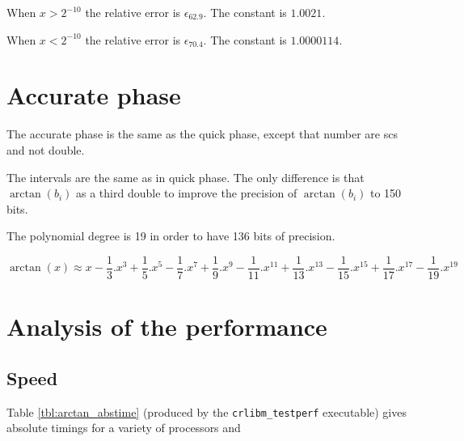 When $x>2^{-10}$ the relative error is $\epsilon_{62.9}$. The
constant is $1.0021$. 

When $x<2^{-10}$ the relative error is $\epsilon_{70.4}$. The
constant is $1.0000114$. 

\section{Accurate phase}
The accurate phase is the same as the quick phase, except that number are
scs and not double.

The intervals are the same as in quick phase. The only difference is that
$\arctan(b_i)$ as a third double to improve the precision of $\arctan(b_i)$ to
150 bits.

The polynomial degree is 19 in order to have 136 bits of precision.

\begin{equation} \arctan(x) \approx
x-\frac{1}{3}.x^3+\frac{1}{5}.x^5-\frac{1}{7}.x^7+\frac{1}{9}.x^9-\frac{1}{11}.x^{11}+\frac{1}{13}.x^{13}-\frac{1}{15}.x^{15}+\frac{1}{17}.x^{17}-\frac{1}{19}.x^{19}
\label{eq:arctan_scspoly}
\end{equation}

\section{Analysis of the performance}

\subsection{Speed}
Table \ref{tbl:arctan_abstime} (produced by the \texttt{crlibm\_testperf}
executable) gives absolute timings for a variety of processors and

